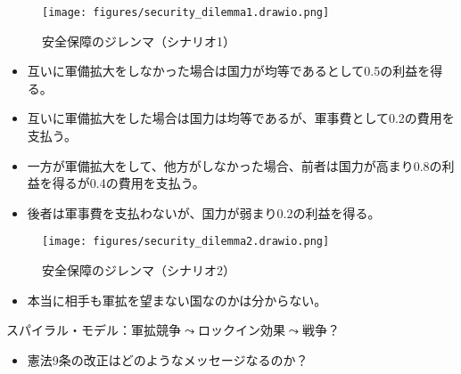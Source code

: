 \documentclass[
  xelatex,
  ja=standard]{bxjsarticle}
\providecommand{\tightlist}{%
  \setlength{\itemsep}{0pt}\setlength{\parskip}{0pt}}\usepackage{longtable,booktabs,array}
\begin{document}
\begin{figure}[htpb]

{\centering \texttt{[image: figures/security\_dilemma1.drawio.png]}

}

\caption{安全保障のジレンマ（シナリオ1）}

\end{figure}

\begin{tcolorbox}[enhanced jigsaw, left=2mm, coltitle=black, bottomtitle=1mm, colback=white, titlerule=0mm, breakable, leftrule=.75mm, opacitybacktitle=0.6, rightrule=.15mm, colbacktitle=quarto-callout-tip-color!10!white, arc=.35mm, colframe=quarto-callout-tip-color-frame, title=\textcolor{quarto-callout-tip-color}{\faLightbulb}\hspace{0.5em}{安全保障のジレンマ（シナリオ2）}, toptitle=1mm, toprule=.15mm, bottomrule=.15mm, opacityback=0]

\begin{itemize}
\tightlist
\item
  互いに軍備拡大をしなかった場合は国力が均等であるとして0.5の利益を得る。
\item
  互いに軍備拡大をした場合は国力は均等であるが、軍事費として0.2の費用を支払う。
\item
  一方が軍備拡大をして、他方がしなかった場合、前者は国力が高まり0.8の利益を得るが0.4の費用を支払う。
\item
  後者は軍事費を支払わないが、国力が弱まり0.2の利益を得る。
\end{itemize}

\end{tcolorbox}

\begin{figure}[htpb]

{\centering \texttt{[image: figures/security\_dilemma2.drawio.png]}

}

\caption{安全保障のジレンマ（シナリオ2）}

\end{figure}

\begin{itemize}
\tightlist
\item
  本当に相手も軍拡を望まない国なのかは分からない。
\end{itemize}

スパイラル・モデル：軍拡競争\(\leadsto\)ロックイン効果\(\leadsto\)戦争？

\begin{itemize}
\tightlist
\item
  憲法9条の改正はどのようなメッセージなるのか？
\end{itemize}
\end{document}
